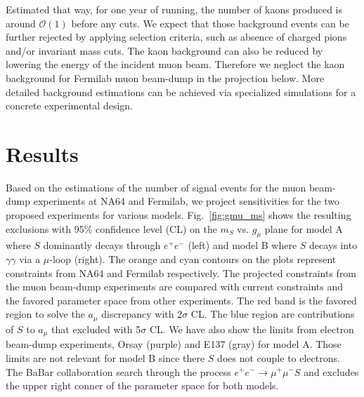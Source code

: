 \documentclass[prd,onecolumn,notitlepage,
nofootinbib,aps,tightenlines,
preprintnumbers,amsmath,amssymb,amsfonts,showpacs,superscriptaddress]{revtex4-1}
\newcommand{\yz}[1]{\textcolor{blue}{\textbf{[YZ: #1]}}}
\begin{document}
Estimated that way, for one year of running, the number of kaons produced is around $\mathcal{O}(1)$ before any cuts. We expect that those background events can be further rejected by applying  selection 
criteria, such as absence of charged pions and/or invariant mass cuts. The kaon background can also be reduced by lowering the energy of the incident muon beam. Therefore we neglect the kaon background for Fermilab muon beam-dump in the projection below. More detailed background estimations can be achieved via specialized simulations for a concrete experimental design. 





\section{Results}
\label{results}
Based on the estimations of  the number of signal events for the muon beam-dump experiments at NA64 and Fermilab,  we project sensitivities for the two proposed experiments for various models. %
Fig.~\ref{fig:gmu_ms} shows the resulting exclusions with 95\% confidence level (CL) on the $m_S$ vs. $g_\mu$ plane for model A  where $S$ dominantly decays through $e^+e^-$ (left) and model B where $S$ decays into $\gamma\gamma$ via a $\mu$-loop (right). The orange and cyan contours on the plots represent constraints from NA64 and Fermilab respectively. The projected constraints from the muon beam-dump experiments are compared with current constraints and the favored parameter space from other experiments. 
The red band is the favored region  to solve the $a_\mu$ discrepancy with 2$\sigma$ CL. The blue region are contributions of $S$ to $a_\mu$ that excluded with 5$\sigma$ CL. We have 
also show the limits from electron beam-dump experiments, Orsay \cite{Davier:1989wz} (purple) 
and E137 \cite{Bjorken:1988as} (gray) for model A. 
Those limits are not relevant for model B since there $S$ does not couple to electrons. The BaBar collaboration search through the process $e^+ e^- \to \mu^+ \mu^- S$  
\cite{TheBABAR:2016rlg} and excludes the upper right conner of the parameter space for both models. 
\end{document}
